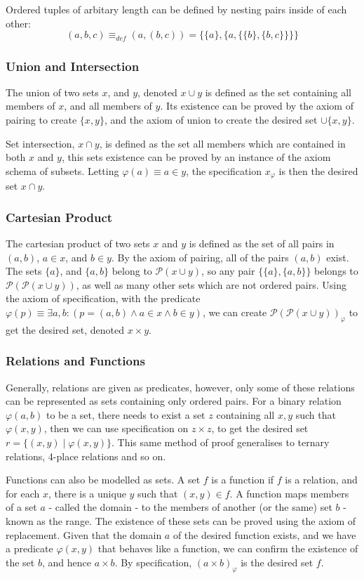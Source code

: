 \documentclass[11pt]{article}
\theoremstyle{definition}
\theoremstyle{theorem}
\theoremstyle{lemma}
\begin{document}
Ordered tuples of arbitary length can be defined by nesting pairs inside of each other:
$$(a,b,c) \equiv_{\mathit{def}} (a,(b,c)) = \{\{a\},\{a, \{\{b\},\{b,c\}\}\}\}$$

\subsubsection*{Union and Intersection}
The union of two sets $x$, and $y$, denoted $x\cup y$ is defined as the set containing all members of $x$, and all members of $y$. Its existence can be proved by the axiom of pairing to create $\{x,y\}$, and the axiom of union to create the desired set $\cup \{x,y\}$.

Set intersection, $x \cap y$, is defined as the set all members which are contained in both $x$ and $y$, this sets existence can be proved by an instance of the axiom schema of subsets. Letting $\varphi(a) \equiv a \in y$, the specification $x_\varphi$ is then the desired set $x \cap y$.

\subsubsection*{Cartesian Product}
The cartesian product of two sets $x$ and $y$ is defined as the set of all pairs in $(a,b)$, $a\in x$, and $b\in y$.
By the axiom of pairing, all of the pairs $(a,b)$ exist.
The sets $\{a\}$, and $\{a,b\}$ belong to $\mathcal{P}(x\cup y)$, so any pair $\{\{a\},\{a,b\}\}$ belongs to $\mathcal{P}(\mathcal{P}(x\cup y))$, as well as many other sets which are not ordered pairs.
Using the axiom of specification, with the predicate
$\varphi(p) \equiv \exists a,b: (p = (a,b) \wedge a\in x \wedge b\in y)$, we can create $\mathcal{P}(\mathcal{P}(x\cup y))_{\varphi}$ to get the desired set, denoted $x\times y$.

\subsubsection*{Relations and Functions}
Generally, relations are given as predicates, however, only some of these relations can be represented as sets containing only ordered pairs.
For a binary relation $\varphi(a,b)$ to be a set, there needs to exist a set $z$ containing all $x,y$ such that $\varphi(x,y)$, then we can use specification on $z\times z$, to get the desired set $r = \{(x,y) \mid \varphi(x,y)\}$.
This same method of proof generalises to ternary relations, 4-place relations and so on.

Functions can also be modelled as sets.
A set $f$ is a function if $f$ is a relation, and for each $x$, there is a unique $y$ such that $(x,y)\in f$.
A function maps members of a set $a$ - called the domain - to the members of another (or the same) set $b$ - known as the range.
The existence of these sets can be proved using the axiom of replacement.
Given that the domain $a$ of the desired function exists, and we have a predicate $\varphi(x,y)$ that behaves like a function, we can confirm the existence of the set $b$, and hence $a\times b$.
By specification, $(a\times b)_\varphi$ is the desired set $f$.
\end{document}
